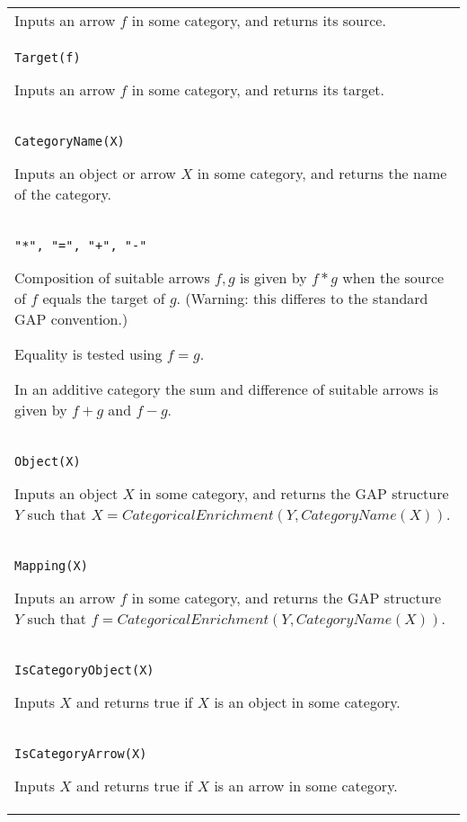 \documentclass[a4paper,11pt]{report}
\begin{document}
{\begin{center}
\begin{tabular}{|l|}
 Inputs an arrow $f$ in some category, and returns its source. \\
 \index{Target} \texttt{Target(f) } 

 Inputs an arrow $f$ in some category, and returns its target. \\
 \index{CategoryName} \texttt{CategoryName(X) } 

 Inputs an object or arrow $X$ in some category, and returns the name of the category. \\
 \texttt{"*", "=", "+", "-" } 

 Composition of suitable arrows $f,g$ is given by $f*g$ when the source of $f$ equals the target of $g$. (Warning: this differes to the standard GAP convention.) 

 Equality is tested using $f=g$. 

In an additive category the sum and difference of suitable arrows is given by $f+g$ and $f-g$. \\
 \index{Object} \texttt{Object(X) } 

 Inputs an object $X$ in some category, and returns the GAP structure $Y$ such that $X=CategoricalEnrichment(Y,CategoryName(X))$. \\
 \index{Mapping} \texttt{Mapping(X) } 

 Inputs an arrow $f$ in some category, and returns the GAP structure $Y$ such that $f=CategoricalEnrichment(Y,CategoryName(X))$. \\
 \index{IsCategoryObject} \texttt{IsCategoryObject(X) } 

 Inputs $X$ and returns true if $X$ is an object in some category. \\
 \index{IsCategoryArrow} \texttt{IsCategoryArrow(X) } 

 Inputs $X$ and returns true if $X$ is an arrow in some category. \\
\end{tabular}\\[2mm]
\end{center}

 }

 
\end{document}
